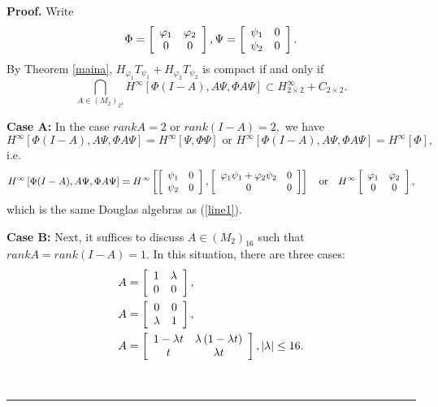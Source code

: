 \documentclass{article}%
\newenvironment{proof}[1][Proof]{\noindent\textbf{#1.} }{\ \rule{0.5em}{0.5em}}
\begin{document}
\begin{proof}
Write
\begin{align}
\Phi=\left[
\begin{array}
[c]{cc}%
\varphi_{1} & \varphi_{2}\\
0 & 0
\end{array}
\right]  ,\Psi=\left[
\begin{array}
[c]{cc}%
\psi_{1} & 0\\
\psi_{2} & 0
\end{array}
\right]  .\nonumber
\end{align}
By Theorem \ref{maina}, $H_{\varphi_{1}}T_{\psi_{1}}+H_{\varphi_{2}}%
T_{\psi_{2}}$ is compact if and only if
\[
\bigcap_{A\in\left(  M_{2}\right)  _{2^{4}}}H^{\infty}\left[  \Phi
(I-A),A\Psi,\Phi A\Psi\right]  \subset H^{\infty}_{2\times2}+C_{2\times2}.
\]


\textbf{{Case A:}} In the case $rankA=2$ or $rank(I-A)=2,$ we have%
\[
H^{\infty}\left[  \Phi(I-A),A\Psi,\Phi A\Psi\right]  = H^{\infty}\left[
\Psi,\Phi\Psi\right]  \text{ or }H^{\infty}\left[  \Phi(I-A),A\Psi,\Phi
A\Psi\right]  =H^{\infty}\left[  \Phi\right]  ,
\]
i.e.
\[
H^{\infty}\left[  \Phi(I-A),A\Psi,\Phi A\Psi\right]  =H^{\infty}\left[
\left[
\begin{array}
[c]{cc}%
\psi_{1} & 0\\
\psi_{2} & 0
\end{array}
\right]  , \left[
\begin{array}
[c]{cc}%
\varphi_{1}\psi_{1}+\varphi_{2}\psi_{2} & 0\\
0 & 0
\end{array}
\right]  \right]  \quad\text{or}\quad H^{\infty} \left[
\begin{array}
[c]{cc}%
\varphi_{1} & \varphi_{2}\\
0 & 0
\end{array}
\right]  ,
\]
which is the same Douglas algebras as (\ref{line1}).

\textbf{{Case B:}} Next, it suffices to discuss $A\in\left(  M_{2}\right)
_{16}$ such that $rankA=rank(I-A)=1.$ In this situation, there are three
cases:%
\begin{align}
A  &  =\left[
\begin{array}
[c]{cc}%
1 & \lambda\\
0 & 0
\end{array}
\right]  ,\label{line1a}\\
A  &  =\left[
\begin{array}
[c]{cc}%
0 & 0\\
\lambda & 1
\end{array}
\right]  ,\label{line2a}\\
A  &  =\left[
\begin{array}
[c]{cc}%
1-\lambda t & \lambda\left(  1-\lambda t\right) \\
t & \lambda t
\end{array}
\right]  ,\left\vert \lambda\right\vert \leq16. \label{line3a}%
\end{align}



\end{proof}
\end{document}
